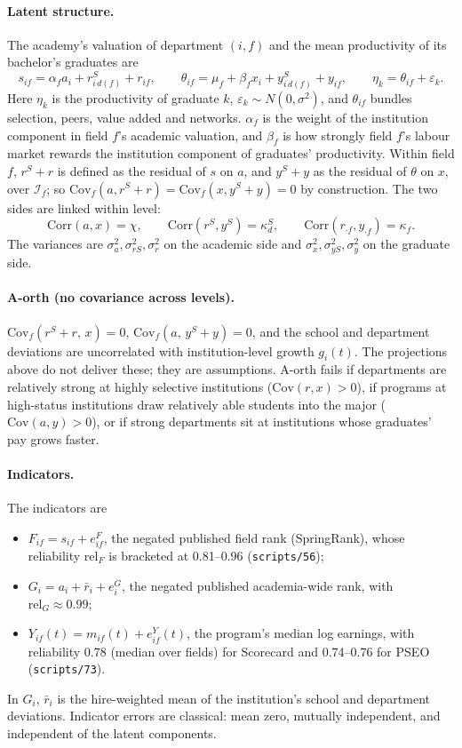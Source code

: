 \paragraph{Latent structure.} The academy's valuation of department $(i,f)$ and the mean productivity of its
bachelor's graduates are
\begin{equation}\label{eq:T-latent}
s_{if}=\alpha_fa_i+r^S_{i\,d(f)}+r_{if},\qquad
\theta_{if}=\mu_f+\beta_fx_i+y^S_{i\,d(f)}+y_{if},\qquad \eta_k=\theta_{if}+\varepsilon_k .
\end{equation}
Here $\eta_k$ is the productivity of graduate $k$, $\varepsilon_k\sim N(0,\sigma^2)$, and $\theta_{if}$ bundles
selection, peers, value added and networks. $\alpha_f$ is the weight of the institution component in field $f$'s
academic valuation, and $\beta_f$ is how strongly field $f$'s labour market rewards the institution component of
graduates' productivity. Within field $f$, $r^S+r$ is defined as the residual of $s$ on $a$, and $y^S+y$ as the
residual of $\theta$ on $x$, over $\mathcal I_f$; so $\mathrm{Cov}_f(a,r^S+r)=\mathrm{Cov}_f(x,y^S+y)=0$ by
construction. The two sides are linked within level:
\[
\mathrm{Corr}(a,x)=\chi,\qquad \mathrm{Corr}(r^S,y^S)=\kappa^S_d,\qquad \mathrm{Corr}(r_{\cdot f},y_{\cdot f})=\kappa_f .
\]
The variances are $\sigma_a^2,\sigma_{rS}^2,\sigma_r^2$ on the academic side and $\sigma_x^2,\sigma_{yS}^2,\sigma_y^2$
on the graduate side.

\paragraph{A-orth (no covariance across levels).} $\mathrm{Cov}_f(r^S+r,\,x)=0$,
$\mathrm{Cov}_f(a,\,y^S+y)=0$, and the school and department deviations are uncorrelated with institution-level
growth $g_i(t)$. The projections above do not deliver these; they are assumptions. A-orth fails if departments
are relatively strong at highly selective institutions ($\mathrm{Cov}(r,x)>0$), if programs at high-status
institutions draw relatively able students into the major ($\mathrm{Cov}(a,y)>0$), or if strong departments sit at
institutions whose graduates' pay grows faster.

\paragraph{Indicators.} The indicators are
\begin{itemize}
\item $F_{if}=s_{if}+e^F_{if}$, the negated published field rank (SpringRank), whose reliability
$\mathrm{rel}_F$ is bracketed at 0.81--0.96 (\texttt{scripts/56});
\item $G_i=a_i+\bar r_i+e^G_i$, the negated published academia-wide rank, with $\mathrm{rel}_G\approx0.99$;
\item $Y_{if}(t)=m_{if}(t)+e^Y_{if}(t)$, the program's median log earnings, with reliability 0.78 (median over
fields) for Scorecard and 0.74--0.76 for PSEO (\texttt{scripts/73}).
\end{itemize}
In $G_i$, $\bar r_i$ is the hire-weighted mean of the institution's school and department deviations. Indicator
errors are classical: mean zero, mutually independent, and independent of the latent components.

